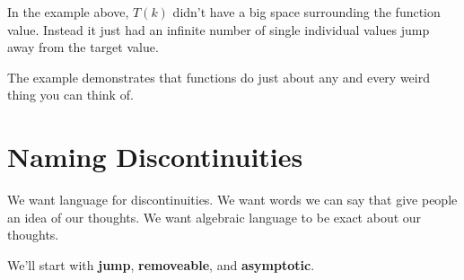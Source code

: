 \documentclass{ximera}
\begin{document}
In the example above, $T(k)$ didn't have a big space surrounding the function value.  Instead it just had an infinite number of single individual values jump away from the target value.


The example demonstrates that functions do just about any and every weird thing you can think of.













\section*{Naming Discontinuities}



We want language for discontinuities.  We want words we can say that give people an idea of our thoughts. We want algebraic language to be exact about our thoughts.


We'll start with \textbf{jump}, \textbf{removeable}, and \textbf{asymptotic}.
\end{document}
